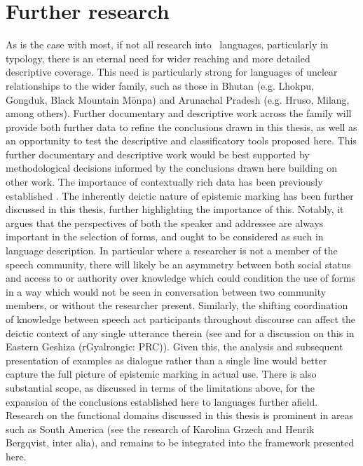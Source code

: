 \section{Further research}
As is the case with most, if not all research into \lfam\ languages, particularly in typology, there is an eternal need for wider reaching and more detailed descriptive coverage. This need is particularly strong for languages of unclear relationships to the wider family, such as those in Bhutan (e.g. Lhokpu, Gongduk, Black Mountain Mönpa) and Arunachal Pradesh (e.g. Hruso, Milang, among others). Further documentary and descriptive work across the family will provide both further data to refine the conclusions drawn in this thesis, as well as an opportunity to test the descriptive and classificatory tools proposed here. This further documentary and descriptive work would be best supported by methodological decisions informed by the conclusions drawn here building on other work. The importance of contextually rich data has been previously established \cites{Grzech2020}{Bodnaruk2023}. The inherently deictic nature of epistemic marking has been further discussed in this thesis, further highlighting the importance of this. Notably, it argues that the perspectives of both the speaker and addressee are always important in the selection of forms, and ought to be considered as such in language description. In particular where a researcher is not a member of the speech community, there will likely be an asymmetry between both social status and access to or authority over knowledge which could condition the use of forms in a way which would not be seen in conversation between two community members, or without the researcher present. Similarly, the shifting coordination of knowledge between speech act participants throughout discourse can affect the deictic context of any single utterance therein (see  and  for a discussion on this in Eastern Geshiza (rGyalrongic: PRC)). Given this, the analysis and subsequent presentation of examples as dialogue rather than a single line would better capture the full picture of epistemic marking in actual use. There is also substantial scope, as discussed in terms of the limitations above, for the expansion of the conclusions established here to languages further afield. Research on the functional domains discussed in this thesis is prominent in areas such as South America (see the research of Karolina Grzech and Henrik Bergqvist, inter alia), and remains to be integrated into the framework presented here.

